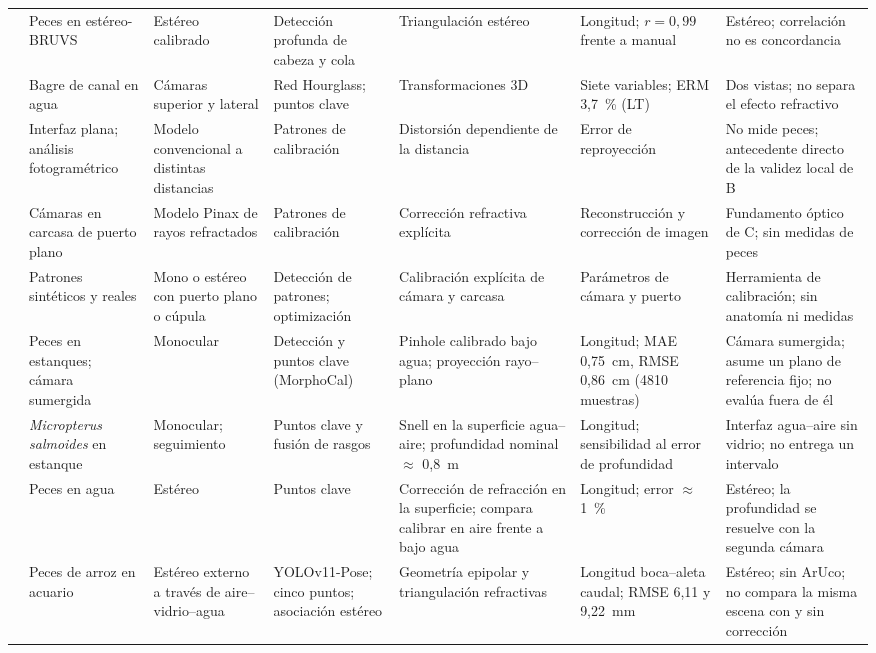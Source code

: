 \begin{longtable}{@{}p{2.2cm}p{2.6cm}p{2.4cm}p{2.8cm}p{2.8cm}p{3.0cm}p{3.2cm}@{}}
\textcite{Marrable2023} & Peces en estéreo-BRUVS & Estéreo calibrado & Detección profunda de cabeza y cola & Triangulación estéreo & Longitud; $r = 0{,}99$ frente a manual & Estéreo; correlación no es concordancia \\
\textcite{ZhangX2025} & Bagre de canal en agua & Cámaras superior y lateral & Red Hourglass; puntos clave & Transformaciones 3D & Siete variables; ERM 3,7~\% (LT) & Dos vistas; no separa el efecto refractivo \\
\textcite{Rofallski2022} & Interfaz plana; análisis fotogramétrico & Modelo convencional a distintas distancias & Patrones de calibración & Distorsión dependiente de la distancia & Error de reproyección & No mide peces; antecedente directo de la validez local de B \\
\textcite{Luczynski2017} & Cámaras en carcasa de puerto plano & Modelo Pinax de rayos refractados & Patrones de calibración & Corrección refractiva explícita & Reconstrucción y corrección de imagen & Fundamento óptico de C; sin medidas de peces \\
\textcite{Seegraber2025} & Patrones sintéticos y reales & Mono o estéreo con puerto plano o cúpula & Detección de patrones; optimización & Calibración explícita de cámara y carcasa & Parámetros de cámara y puerto & Herramienta de calibración; sin anatomía ni medidas \\
\textcite{Vijayalakshmi2026} & Peces en estanques; cámara sumergida & Monocular & Detección y puntos clave (MorphoCal) & Pinhole calibrado bajo agua; proyección rayo--plano & Longitud; MAE 0,75~cm, RMSE 0,86~cm (4810 muestras) & Cámara sumergida; asume un plano de referencia fijo; no evalúa fuera de él \\
\textcite{Yin2026} & \emph{Micropterus salmoides} en estanque & Monocular; seguimiento & Puntos clave y fusión de rasgos & Snell en la superficie agua--aire; profundidad nominal $\approx$ 0,8~m & Longitud; sensibilidad al error de profundidad & Interfaz agua--aire sin vidrio; no entrega un intervalo \\
\textcite{Zhou2023} & Peces en agua & Estéreo & Puntos clave & Corrección de refracción en la superficie; compara calibrar en aire frente a bajo agua & Longitud; error $\approx$ 1~\% & Estéreo; la profundidad se resuelve con la segunda cámara \\
\textcite{Seibold2026} & Peces de arroz en acuario & Estéreo externo a través de aire--vidrio--agua & YOLOv11-Pose; cinco puntos; asociación estéreo & Geometría epipolar y triangulación refractivas & Longitud boca--aleta caudal; RMSE 6,11 y 9,22~mm & Estéreo; sin ArUco; no compara la misma escena con y sin corrección \\
\end{longtable}
